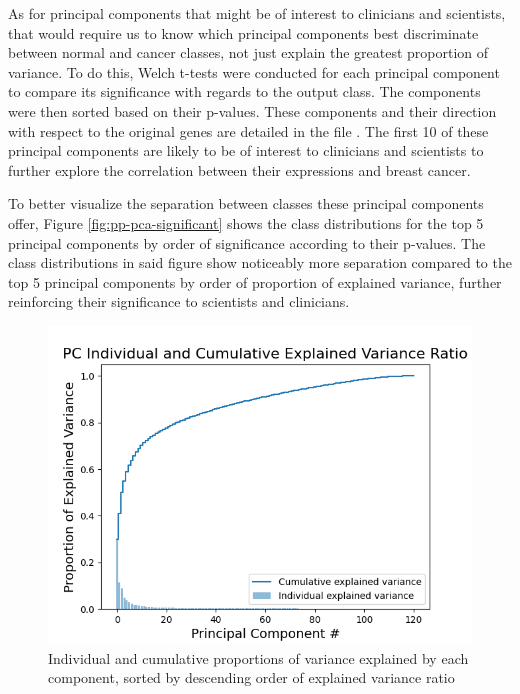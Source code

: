 \documentclass[twocolumn]{article}
\begin{document}
As for principal components that might be of interest to clinicians and scientists, that would require us to know which principal components best discriminate between normal and cancer classes, not just explain the greatest proportion of variance. To do this, Welch t-tests were conducted for each principal component to compare its significance with regards to the output class. The components were then sorted based on their p-values. These components and their direction with respect to the original genes are detailed in the file . The first 10 of these principal components are likely to be of interest to clinicians and scientists to further explore the correlation between their expressions and breast cancer.

To better visualize the separation between classes these principal components offer, Figure \ref{fig:pp-pca-significant} shows the class distributions for the top 5 principal components by order of significance according to their p-values. The class distributions in said figure show noticeably more separation compared to the top 5 principal components by order of proportion of explained variance, further reinforcing their significance to scientists and clinicians.

\begin{figure}[H]
    \centering
    \includegraphics[width=\linewidth]{figures/PCA_Explained_Variance_Curve.png}
    \caption{Individual and cumulative proportions of variance explained by each component, sorted by descending order of explained variance ratio}
    \label{fig:pc-variance}
\end{figure}
\end{document}
